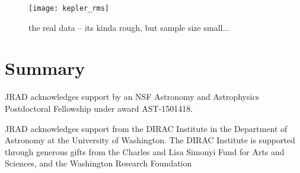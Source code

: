 \documentclass[preprint2]{aastex62}
\begin{document}
\begin{figure}[!t]
\centering
\texttt{[image: kepler\_rms]}
\caption{
the real data -- its kinda rough, but sample size small...
}
\label{fig:rms}
\end{figure}



\section{Summary}
\label{sec:summary}





\acknowledgments

JRAD acknowledges support by an NSF Astronomy and Astrophysics Postdoctoral Fellowship under award AST-1501418. 

JRAD acknowledges support from the DIRAC Institute in the Department of Astronomy at the University of Washington. The DIRAC Institute is supported through generous gifts from the Charles and Lisa Simonyi Fund for Arts and Sciences, and the Washington Research Foundation


\end{document}
